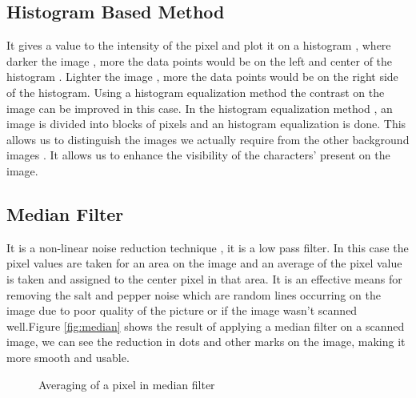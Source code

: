 \documentclass[9pt,twocolumn,twoside]{../../styles/osajnl}
\begin{document}
\subsection{Histogram Based Method}

It gives a value to the intensity of the pixel and plot it on a
histogram , where darker the image , more the data points would be on
the left and center of the histogram . Lighter the image , more the
data points would be on the right side of the histogram. Using a
histogram equalization method the contrast on the image can be
improved in this case. In the histogram equalization method , an image
is divided into blocks of pixels and an histogram equalization is
done.  This allows us to distinguish the images we actually require
from the other background images . It allows us to enhance the
visibility of the characters’ present on the image.

\subsection{Median Filter}
It is a non-linear noise reduction technique , it is a low pass
filter. In this case the pixel values are taken for an area on the
image and an average of the pixel value is taken and assigned to the
center pixel in that area. It is an effective means for removing the
salt and pepper noise which are random lines occurring on the image
due to poor quality of the picture or if the image wasn’t scanned
well.\cite{medianfilterpreprocessing}Figure \ref{fig:median} shows the result of
applying a median filter on a scanned image, we can see the reduction
in dots and other marks on the image, making it more smooth and
usable.


\begin{figure}[H]
\centering
{}
\caption{Averaging of a pixel in median filter}\cite{medianfilterpreprocessing}
\label{fig:Illustration of an OCR system}
\end{figure}
\end{document}

